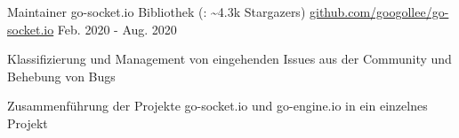 

\begin{cventries}

  \cventry
  {Maintainer} %
  {\faGithub{} go-socket.io Bibliothek (\faStar{}: \textasciitilde 4.3k Stargazers)} %
  {\href{https://github.com/googollee/go-socket.io}{github.com/googollee/go-socket.io}} %
  {Feb. 2020 - Aug. 2020} %
  {
    \begin{cvitems} %
      \item {Klassifizierung und Management von eingehenden Issues aus der Community und Behebung von Bugs}
      \item {Zusammenführung der Projekte go-socket.io und go-engine.io in ein einzelnes Projekt}
    \end{cvitems}
  }

\end{cventries}
